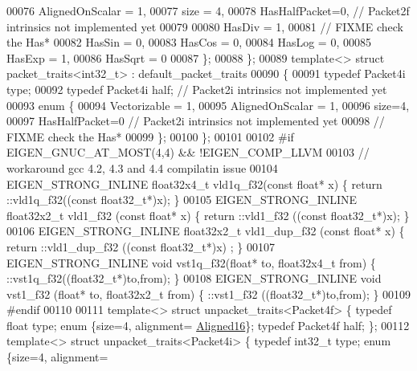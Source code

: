 \begin{DoxyCode}
{00076     AlignedOnScalar = 1,
00077     size = 4,
00078     HasHalfPacket=0, \textcolor{comment}{// Packet2f intrinsics not implemented yet}
00079    
00080     HasDiv  = 1,
00081     \textcolor{comment}{// FIXME check the Has*}
00082     HasSin  = 0,
00083     HasCos  = 0,
00084     HasLog  = 0,
00085     HasExp  = 1,
00086     HasSqrt = 0
00087   \};
00088 \};
00089 \textcolor{keyword}{template}<> \textcolor{keyword}{struct }packet\_traits<int32\_t>    : default\_packet\_traits
00090 \{
00091   \textcolor{keyword}{typedef} Packet4i type;
00092   \textcolor{keyword}{typedef} Packet4i half; \textcolor{comment}{// Packet2i intrinsics not implemented yet}
00093   \textcolor{keyword}{enum} \{
00094     Vectorizable = 1,
00095     AlignedOnScalar = 1,
00096     size=4,
00097     HasHalfPacket=0 \textcolor{comment}{// Packet2i intrinsics not implemented yet}
00098     \textcolor{comment}{// FIXME check the Has*}
00099   \};
00100 \};
00101 
00102 \textcolor{preprocessor}{#if EIGEN\_GNUC\_AT\_MOST(4,4) && !EIGEN\_COMP\_LLVM}
00103 \textcolor{comment}{// workaround gcc 4.2, 4.3 and 4.4 compilatin issue}
00104 EIGEN\_STRONG\_INLINE float32x4\_t vld1q\_f32(\textcolor{keyword}{const} \textcolor{keywordtype}{float}* x) \{ return ::vld1q\_f32((\textcolor{keyword}{const} float32\_t*)x); \}
00105 EIGEN\_STRONG\_INLINE float32x2\_t vld1\_f32 (\textcolor{keyword}{const} \textcolor{keywordtype}{float}* x) \{ return ::vld1\_f32 ((\textcolor{keyword}{const} float32\_t*)x); \}
00106 EIGEN\_STRONG\_INLINE float32x2\_t vld1\_dup\_f32 (\textcolor{keyword}{const} \textcolor{keywordtype}{float}* x) \{ return ::vld1\_dup\_f32 ((\textcolor{keyword}{const} float32\_t*)x)
      ; \}
00107 EIGEN\_STRONG\_INLINE \textcolor{keywordtype}{void}        vst1q\_f32(\textcolor{keywordtype}{float}* to, float32x4\_t from) \{ ::vst1q\_f32((float32\_t*)to,from); 
      \}
00108 EIGEN\_STRONG\_INLINE \textcolor{keywordtype}{void}        vst1\_f32 (\textcolor{keywordtype}{float}* to, float32x2\_t from) \{ ::vst1\_f32 ((float32\_t*)to,from); 
      \}
00109 \textcolor{preprocessor}{#endif}
00110 
00111 \textcolor{keyword}{template}<> \textcolor{keyword}{struct }unpacket\_traits<Packet4f> \{ \textcolor{keyword}{typedef} \textcolor{keywordtype}{float}   type; \textcolor{keyword}{enum} \{size=4, alignment=
      \hyperlink{group__enums_gga45fe06e29902b7a2773de05ba27b47a1af8e2bf74b04c02199f62c5e3c06dbfcc}{Aligned16}\}; \textcolor{keyword}{typedef} Packet4f half; \};
00112 \textcolor{keyword}{template}<> \textcolor{keyword}{struct }unpacket\_traits<Packet4i> \{ \textcolor{keyword}{typedef} int32\_t type; \textcolor{keyword}{enum} \{size=4, alignment=
}
\end{DoxyCode}
